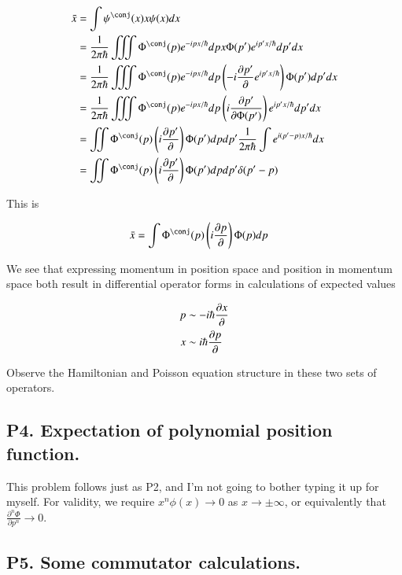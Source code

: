 \documentclass{article}
\newcommand{\PDN}[3]{\frac{\partial^{#3} {#2}}{\partial {#1}^{#3}}}
\begin{document}
\begin{align*}
\bar{x} 
&= \int \psi^\conj(x) x \psi(x) dx \\
&= 
\inv{2\pi\hbar} \iiint \Phi^\conj(p) e^{-ipx/\hbar} dp x \Phi(p') e^{ip'x/\hbar} dp' dx \\
&= 
\inv{2\pi\hbar} \iiint \Phi^\conj(p) e^{-ipx/\hbar} dp \left( -i \PD{p'}{} e^{ip'x/\hbar} \right) \Phi(p') dp' dx \\
&= 
\inv{2\pi\hbar} \iiint \Phi^\conj(p) e^{-ipx/\hbar} dp \left( i \PD{p'}{\Phi(p')} \right) e^{ip'x/\hbar} dp' dx \\
&= 
\iint \Phi^\conj(p) \left( i \PD{p'}{} \right) {\Phi(p')} dp dp' \inv{2\pi\hbar} \int e^{i(p'-p)x/\hbar} dx  \\
&= 
\iint \Phi^\conj(p) \left( i \PD{p'}{} \right) {\Phi(p')} dp dp' \delta(p'-p)  \\
\end{align*}

This is

\begin{align*}
\bar{x} &= \int \Phi^\conj(p) \left( i \PD{p}{} \right) {\Phi(p)} dp 
\end{align*}

We see that expressing momentum in position space and position in momentum space both result in differential
operator forms in calculations of expected values

\begin{align}\label{eqn:operatorCorrespondance}
p &\sim -i \hbar \frac{\partial{x}}{\partial {}} \\
x &\sim i \hbar \frac{\partial{p}}{\partial {}}
\end{align}

Observe the Hamiltonian and Poisson equation structure in these two sets of operators.

\subsection{ P4. Expectation of polynomial position function. }

This problem follows just as P2, and I'm not going to bother typing it up for myself.  For validity, we require
$x^n \phi(x) \rightarrow 0$ as $x \rightarrow \pm \infty$, or equivalently that $\PDN{p}{\Phi}{n} \rightarrow 0$.

\subsection{ P5. Some commutator calculations. }
\end{document}
